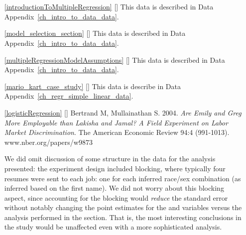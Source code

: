 \section{}
\label{ch_regr_mult_and_log_data}

\begin{itemize}
\item[\ref{introductionToMultipleRegression}]
    [\datalink{loans\_full\_schema}]
    This data is described in
    Data Appendix~\ref{ch_intro_to_data_data}.

\item[\ref{model_selection_section}]
    [\datalink{loans\_full\_schema}]
    This data is described in
    Data Appendix~\ref{ch_intro_to_data_data}.

\item[\ref{multipleRegressionModelAssumptions}]
    [\datalink{loans\_full\_schema}]
    This data is described in
    Data Appendix~\ref{ch_intro_to_data_data}.

\item[\ref{mario_kart_case_study}]
    [\datalink{mario\_kart}]
    This data is describe in
    Data Appendix~\ref{ch_regr_simple_linear_data}.

\item[\ref{logisticRegression}]
    [\datalink{resume}]
    Bertrand M, Mullainathan S. 2004.
    \emph{Are Emily and Greg More Employable than Lakisha and Jamal?
    A Field Experiment on Labor Market Discrimination}.
    The American Economic Review 94:4 (991-1013).
        {www.nber.org/papers/w9873}

    We did omit discussion of some structure in
    the data for the analysis presented:
    the experiment design included blocking,
    where typically four resumes were sent to each job:
    one for each inferred race/sex combination
    (as inferred based on the first name).
    We did not worry about this blocking aspect,
    since accounting for the blocking would
    \emph{reduce} the standard error without notably
    changing the point estimates for the
     and  variables
    versus the analysis performed in the section.
    That is, the most interesting conclusions in the
    study would be unaffected even with a more
    sophisticated analysis.


\end{itemize}
